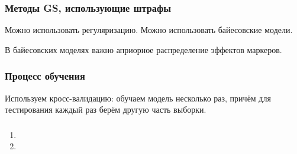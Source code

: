 \documentclass[main.tex]{subfiles}
\begin{document}
\subsubsection{Методы GS, использующие штрафы}

Можно использовать регуляризацию.
Можно использовать байесовские модели.

В байесовских моделях важно априорное распределение эффектов маркеров.

\subsubsection{ Процесс обучения }

Используем кросс-валидацию: обучаем модель несколько раз, причём для тестирования каждый раз берём другую часть выборки.

\subsubsection{}

\begin{enumerate}[noitemsep]
    \item
    \item
\end{enumerate}
\end{document}
